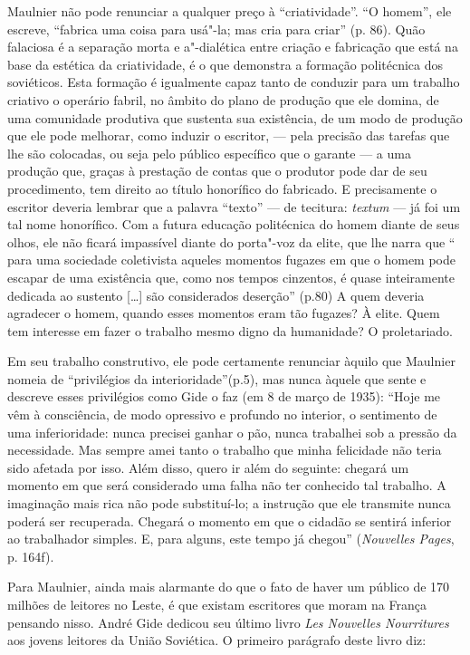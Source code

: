 Maulnier não pode renunciar a qualquer preço à ``criatividade''. ``O
homem'', ele escreve, ``fabrica uma coisa para usá"-la; mas cria para
criar'' (p. 86). Quão falaciosa é a separação morta e a"-dialética entre
criação e fabricação que está na base da estética da criatividade, é o
que demonstra a formação politécnica dos soviéticos. Esta formação é
igualmente capaz tanto de conduzir para um trabalho criativo o operário
fabril, no âmbito do plano de produção que ele domina, de uma comunidade
produtiva que sustenta sua existência, de um modo de produção que ele
pode melhorar, como induzir o escritor, --- pela precisão das tarefas que
lhe são colocadas, ou seja pelo público específico que o garante --- a
uma produção que, graças à prestação de contas que o produtor pode dar
de seu procedimento, tem direito ao título honorífico do fabricado. E
precisamente o escritor deveria lembrar que a palavra ``texto'' --- de
tecitura: \emph{textum} --- já foi um tal nome honorífico. Com a futura
educação politécnica do homem diante de seus olhos, ele não ficará
impassível diante do porta"-voz da elite, que lhe narra que `` para uma
sociedade coletivista aqueles momentos fugazes em que o homem pode
escapar de uma existência que, como nos tempos cinzentos, é quase
inteiramente dedicada ao sustento {[}\ldots{}{]} são considerados deserção''
(p.80) A quem deveria agradecer o homem, quando esses momentos eram tão
fugazes? À elite. Quem tem interesse em fazer o trabalho mesmo digno da
humanidade? O proletariado.

Em seu trabalho construtivo, ele pode certamente renunciar àquilo que
Maulnier nomeia de ``privilégios da interioridade''(p.5), mas nunca
àquele que sente e descreve esses privilégios como Gide o faz (em 8 de
março de 1935): ``Hoje me vêm à consciência, de modo opressivo e
profundo no interior, o sentimento de uma inferioridade: nunca precisei
ganhar o pão, nunca trabalhei sob a pressão da necessidade. Mas sempre
amei tanto o trabalho que minha felicidade não teria sido afetada por
isso. Além disso, quero ir além do seguinte: chegará um momento em que
será considerado uma falha não ter conhecido tal trabalho. A imaginação
mais rica não pode substituí-lo; a instrução que ele transmite nunca
poderá ser recuperada. Chegará o momento em que o cidadão se sentirá
inferior ao trabalhador simples. E, para alguns, este tempo já chegou''
(\emph{Nouvelles Pages}, p. 164f).

Para Maulnier, ainda mais alarmante do que o fato de haver um público de
170 milhões de leitores no Leste, é que existam escritores que moram na
França pensando nisso. André Gide dedicou seu último livro \emph{Les
Nouvelles Nourritures} aos jovens leitores da União Soviética. O
primeiro parágrafo deste livro diz:

